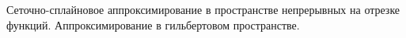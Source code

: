 \documentclass[__main__.tex]{subfiles}
\begin{document}
Сеточно-сплайновое аппроксимирование в пространстве непрерывных на отрезке функций. Аппроксимирование в гильбертовом пространстве.
\end{document}
